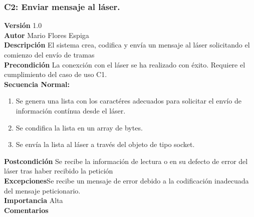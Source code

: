  \subsubsection{ C2: Enviar mensaje al láser.}
\textbf{Versión} 1.0\\
\textbf{Autor} Mario Flores Espiga\\
\textbf{Descripción} El sistema crea, codifica y envía un mensaje al láser solicitando el comienzo del envío de tramas\\
\textbf{Precondición} La conexción con el láser se ha realizado con éxito. Requiere el cumplimiento del caso de uso C1.\\
\textbf{Secuencia Normal:} 
\begin{enumerate}
	\item Se genera una lista con los caractéres adecuados para solicitar el envío de información contínua desde el láser.
	\item Se condifica la lista en un array de bytes.
	\item Se envía la lista al láser a través del objeto de tipo socket.

\end{enumerate}
\textbf{Postcondición} Se recibe la información de lectura o en su defecto de error del láser tras haber recibido la petición\\
\textbf{Excepciones}Se recibe un mensaje de error debido a la codificación inadecuada del mensaje peticionario.\\
\textbf{Importancia} Alta\\
\textbf{Comentarios}

